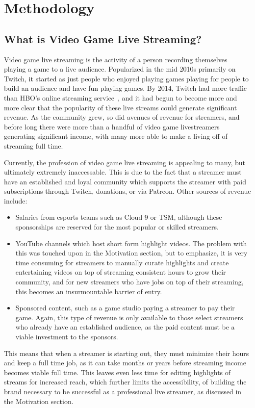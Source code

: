 \documentclass[12pt]{article}
\begin{document}
\section{Methodology}
\subsection{What is Video Game Live Streaming?}
Video game live streaming is the activity of a person recording themselves playing a game to a live audience. Popularized in the mid 2010s primarily on Twitch, it started
as just people who enjoyed playing games playing for people to build an audience and have fun playing games. By 2014, Twitch had more traffic than HBO's online streaming 
service~\cite{graziano_2014}, and it had begun to become more and more clear that the popularity of these live streams could generate significant revenue. As the community grew,
so did avenues of revenue for streamers, and before long there were more than a handful of video game livestreamers generating significant income, with many more able to make a 
living off of streaming full time.



Currently, the profession of video game live streaming is appealing to many, but ultimately extremely inaccessable. This is due to the fact that a streamer must have an 
established and loyal community which supports the streamer with paid subscriptions through Twitch, donations, or via Patreon. Other sources of revenue include:
\begin{itemize}
    \item Salaries from esports teams such as Cloud 9 or TSM, although these sponsorships are reserved for the most popular or skilled streamers. 
    \item YouTube channels which host short form highlight videos. The problem with this was touched upon in the Motivation section, but to emphasize, 
    it is very time consuming for streamers to manually curate highlights and create entertaining videos on top of streaming consistent hours to grow their 
    community, and for new streamers who have jobs on top of their streaming, this becomes an insurmountable barrier of entry.
    \item Sponsored content, such as a game studio paying a streamer to pay their game. Again, this type of revenue is only available to those select streamers
    who already have an established audience, as the paid content must be a viable investment to the sponsors.
\end{itemize}
This means that when a streamer is starting out, they must minimize their hours and keep a full time job, as it can take months or years before streaming 
income becomes viable full time. This leaves even less time for editing highlights of streams for increased reach, which further limits the accessibility, 
of building the brand necessary to be successful as a professional live streamer,  as discussed in the Motivation section.
\end{document}

